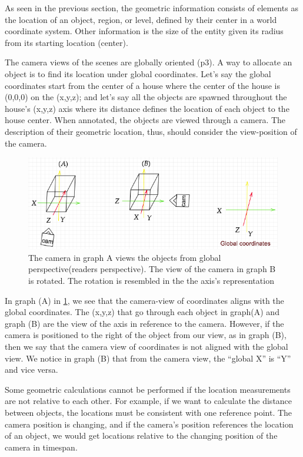 As seen in the previous section, the geometric information consists of elements as the location of an object, region, or level, defined by their center in a world coordinate system. Other information is the size of the entity given its radius from its starting location (center).   

The camera views of the scenes are globally oriented \cite{Matterport3D}(p3). A way to allocate an object is to find its location under global coordinates. Let’s say the global coordinates start from the center of a house where the center of the house is (0,0,0) on the (x,y,z); and let’s say all the objects are spawned throughout the house’s (x,y,z) axis where its distance defines the location of each object to the house center. When annotated, the objects are viewed through a camera. The description of their geometric location, thus, should consider the view-position of the camera. 

\begin{figure}[H]
\centering
\includegraphics[scale=0.53]{images/campos.png}
\caption{The camera in graph A views the objects from global perspective(readers perspective). The view of the camera in graph B is rotated. The rotation is resembled in the the axis's representation }
\label{fig:campos}
\end{figure}

In graph (A) in \ref{fig:campos}, we see that the camera-view of coordinates aligns with the global coordinates. The (x,y,z) that go through each object in graph(A) and graph (B) are the view of the axis in reference to the camera. However, if the camera is positioned to the right of the object from our view, as in graph (B), then we say that the camera view of coordinates is not aligned with the global view. We notice in graph (B) that from the camera view, the “global X” is “Y” and vice versa.

Some geometric calculations cannot be performed if the location measurements are not relative to each other. For example, if we want to calculate the distance between objects, the locations must be consistent with one reference point. The camera position is changing, and if the camera’s position references the location of an object, we would get locations relative to the changing position of the camera in timespan. 

